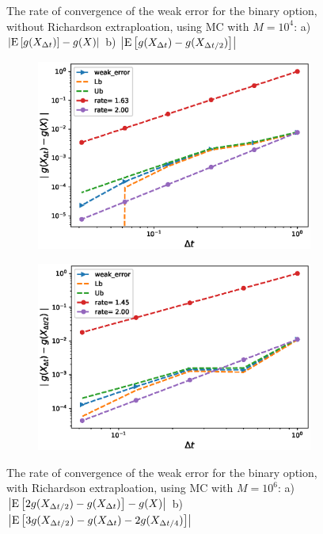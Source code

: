 \documentclass[11pt]{article}
\newcommand{\expt}[1]{\mathrm{E}\left[#1\right]}
\begin{document}
\begin{figure}[h!]
	\caption{The rate of convergence of the weak error for the binary option, without Richardson extraploation, using MC with $M=10^4$: a) $\abs{\expt{g(X_{\Delta t})}-g(X)}$  b) $\abs{\expt{g(X_{\Delta t})-g(X_{\Delta t/2})}}$ }
	\label{fig:Weak_rate_binary_without_rich}
\end{figure}
\begin{figure}[h!]
	\centering
	\begin{subfigure}{.4\textwidth}
		\centering
		\includegraphics[width=1\linewidth]{./figures/binary_weak_error/with_richardson/weak_convergence_order_binary_richardson_relative_M_5_10_6}
		\caption{}
		\label{fig:sub3}
	\end{subfigure}%
	\begin{subfigure}{.4\textwidth}
		\centering
		\includegraphics[width=1\linewidth]{./figures/binary_weak_error/with_richardson/weak_convergence_order_differences_binary_richardson_relative_M_5_10_6}
		\caption{}
		\label{fig:sub4}
	\end{subfigure}
	
	\caption{The rate of convergence of the weak error for the binary option, with Richardson extraploation, using MC with $M=10^6$: a) $\abs{\expt{2 g(X_{\Delta t/2}) -g(X_{\Delta t})}-g(X)}$  b) $\abs{\expt{3 g(X_{\Delta t/2})-g(X_{\Delta t})-2 g(X_{\Delta t/4})}}$ }
	\label{fig:fig:Weak_rate_binary_with_rich}
\end{figure}
\end{document}
